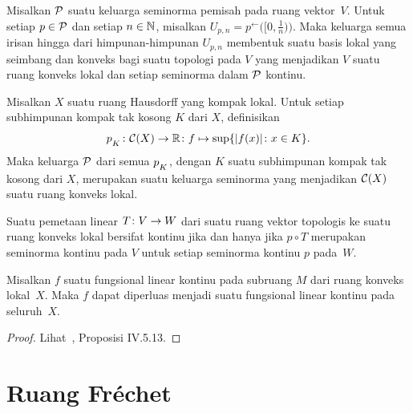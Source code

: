\begin{prop}\label{prop_clbase_from_snorms} Misalkan $\mathcal{P}$ suatu keluarga seminorma pemisah pada ruang vektor~$V$. Untuk setiap
$p \in \mathcal{P}$ dan setiap $n \in \mathbb{N}$, misalkan $U_{p,n} = p^{\gets}\bigl([0,\frac1n)\bigr)$. Maka keluarga semua irisan hingga
dari himpunan-himpunan $U_{p,n}$ membentuk suatu basis lokal yang seimbang dan konveks bagi suatu topologi pada $V$ yang menjadikan $V$
suatu ruang konveks lokal dan setiap seminorma dalam $\mathcal{P}$ kontinu.
\end{prop}

\begin{exam}\label{X_LCS1} Misalkan $X$ suatu ruang Hausdorff yang kompak lokal. Untuk setiap subhimpunan kompak tak kosong $K$ dari $X$, definisikan
   \[ p_{{}_{\scriptstyle{K}}}\colon \mathcal{C}(X) \rightarrow \mathbb{R}\colon f \mapsto \sup\{\lvert f(x)\rvert\colon x \in K\}. \]
Maka keluarga $\mathcal{P}$ dari semua $p_{{}_{\scriptstyle{K}}}$, dengan $K$ suatu subhimpunan kompak tak kosong dari $X$, merupakan suatu keluarga seminorma
yang menjadikan $\mathcal{C}(X)$ suatu ruang konveks lokal.
\end{exam}

\begin{prop} Suatu pemetaan linear $T\colon V \rightarrow W$ dari suatu ruang vektor topologis ke suatu ruang konveks lokal bersifat kontinu jika dan hanya jika
$p \circ T$ merupakan seminorma kontinu pada $V$ untuk setiap seminorma kontinu $p$ pada~$W$.
\end{prop}

\begin{prop} Misalkan $f$ suatu fungsional linear kontinu pada subruang $M$ dari ruang konveks lokal~$X$. Maka $f$ dapat diperluas menjadi suatu
fungsional linear kontinu pada seluruh~$X$.
\end{prop}



\begin{proof} Lihat~\cite{Conway:1990}, Proposisi IV.5.13.   \ns
\end{proof}



















\section{Ruang Fr\'echet}

